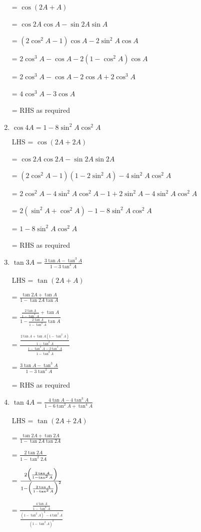 \documentclass[../main.tex]{subfiles}
\begin{document}
\begin{enumerate}
    = $\cos{(2A+A)}$

    = $\cos{2A}\cos{A}-\sin{2A}\sin{A}$

    = $(2\cos^2{A}-1)\cos{A}-2\sin^2{A}\cos{A}$

    = $2\cos^3{A}-\cos{A}-2(1-\cos^2{A})\cos{A}$

    = $2\cos^3{A}-\cos{A}-2\cos{A}+2\cos^3{A}$

    = $4\cos^3{A}-3\cos{A}$

    = RHS as required

    \item $\cos{4A}=1-8\sin^2{A}\cos^2{A}$
    
    LHS = $\cos{(2A+2A)}$

    = $\cos{2A}\cos{2A}-\sin{2A}\sin{2A}$

    = $(2\cos^2{A}-1)(1-2\sin^2{A})-4\sin^2{A}\cos^2{A}$

    = $2\cos^2{A}-4\sin^2{A}\cos^2{A}-1+2\sin^2{A}-4\sin^2{A}\cos^2{A}$

    = $2(\sin^2{A}+\cos^2{A})-1-8\sin^2{A}\cos^2{A}$

    = $1-8\sin^2{A}\cos^2{A}$

    = RHS as required

    \item $\tan{3A}=\frac{3\tan{A}-\tan^3{A}}{1-3\tan^2{A}}$
    
    LHS = $\tan{(2A+A)}$

    = $\frac{\tan{2A}+\tan{A}}{1-\tan{2A}\tan{A}}$

    = $\frac{\frac{2\tan{A}}{1-\tan^2{A}}+\tan{A}}{1-\frac{2\tan{A}}{1-\tan^2{A}}\tan{A}}$

    = $\frac{\frac{2\tan{A}+\tan{A}(1-\tan^2{A})}{1-\tan^2{A}}}{\frac{1-\tan^2{A}-2\tan^2{A}}{1-\tan^2{A}}}$

    = $\frac{3\tan{A}-\tan^3{A}}{1-3\tan^2{A}}$

    = RHS as required

    \item $\tan{4A}=\frac{4\tan{A}-4\tan^3{A}}{1-6\tan^2{A}+\tan^4{A}}$
    
    LHS = $\tan{(2A+2A)}$

    = $\frac{\tan{2A}+\tan{2A}}{1-\tan{2A}\tan{2A}}$

    = $\frac{2\tan{2A}}{1-\tan^2{2A}}$

    = $\frac{2\Bigl(\frac{2\tan{A}}{1-\tan^2{A}}\Bigr)}{1-\Bigl(\frac{2\tan{A}}{1-\tan^2{A}}\Bigr)^2}$

    = $\frac{\frac{4\tan{A}}{1-\tan^2{A}}}{\frac{(1-\tan^2{A})^2-4\tan^2{A}}{(1-\tan^2{A})^2}}$


\end{enumerate}
\end{document}
